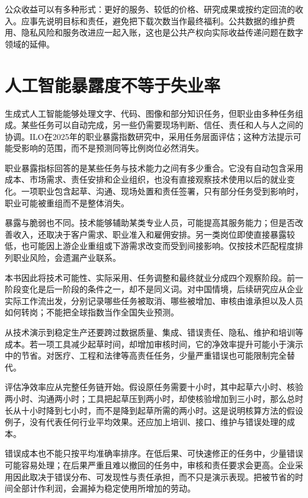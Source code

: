 \documentclass[UTF8,fontset=fandol,zihao=-4,oneside,openany]{ctexbook}
\begin{document}
公众收益可以有多种形式：更好的服务、较低的价格、研究成果或按约定回流的收入。应事先说明目标和责任，避免把下载次数当作最终福利。公共数据的维护费用、隐私风险和服务改进应一起入账，这也是公共产权向实际收益传递问题在数字领域的延伸。

\section{人工智能暴露度不等于失业率}
生成式人工智能能够处理文字、代码、图像和部分知识任务，但职业由多种任务组成。某些任务可以自动完成，另一些仍需要现场判断、信任、责任和人与人之间的协调。ILO在2025年的职业暴露指数研究中，采用任务层面评估；这种方法提示可能受影响的范围，而不是预测同等比例岗位必然消失。\cite{ILO2025}

\label{arg:P190}
职业暴露指标回答的是某些任务与技术能力之间有多少重合。它没有自动包含采用成本、市场需求、责任安排和企业组织，也没有直接观察技术使用以后的就业变化。一项职业包含起草、沟通、现场处置和责任签署，只有部分任务受到影响时，职业可能被重组而不是整体消失。\cite{ILO2025}

暴露与脆弱也不同。技术能够辅助某类专业人员，可能提高其服务能力；但是否改善收入，还取决于客户需求、职业准入和雇佣安排。另一类岗位即使直接暴露较低，也可能因上游企业重组或下游需求改变而受到间接影响。仅按技术匹配程度排列职业风险，会遗漏产业联系。

本书因此将技术可能性、实际采用、任务调整和最终就业分成四个观察阶段。前一阶段变化是后一阶段的条件之一，却不是同义词。对中国情境，后续研究应从企业实际工作流出发，分别记录哪些任务被取消、哪些被增加、审核由谁承担以及人员如何转岗；不能把全球指数当作全国失业预测。

从技术演示到稳定生产还要跨过数据质量、集成、错误责任、隐私、维护和培训等成本。若一项工具减少起草时间，却增加审核时间，它的净效率提升可能小于演示中的节省。对医疗、工程和法律等高责任任务，少量严重错误也可能限制完全替代。

\label{arg:P191}
评估净效率应从完整任务链开始。假设原任务需要十小时，其中起草六小时、核验两小时、沟通两小时；工具把起草压到两小时，却使核验增加到三小时，那么总时长从十小时降到七小时，而不是降到起草所需的两小时。这是说明核算方法的假设例子，没有代表任何行业平均效果。还应加上培训、接口、维护与错误处理的成本。

错误成本也不能只按平均准确率排序。在低后果、可快速修正的任务中，少量错误可能容易处理；在后果严重且难以撤回的任务中，审核和责任要求会更高。企业采用因此取决于错误分布、可发现性与责任承担，而不只是演示表现。把被节省的时间全部计作利润，会漏掉为稳定使用所增加的劳动。
\end{document}
